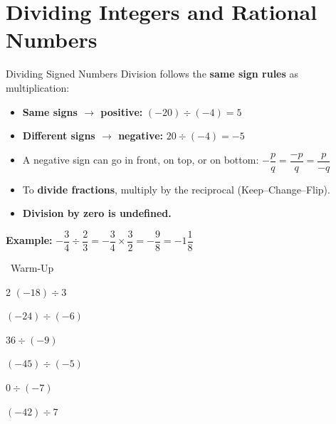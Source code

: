\section{Dividing Integers and Rational Numbers}

\begin{quickReview}{Dividing Signed Numbers}
Division follows the \textbf{same sign rules} as multiplication:

\begin{itemize}[leftmargin=*]
    \item \textbf{Same signs $\to$ positive:} $(-20) \div (-4) = 5$
    \item \textbf{Different signs $\to$ negative:} $20 \div (-4) = -5$
    \item A negative sign can go in front, on top, or on bottom: $-\dfrac{p}{q} = \dfrac{-p}{q} = \dfrac{p}{-q}$
    \item To \textbf{divide fractions}, multiply by the reciprocal (Keep--Change--Flip).
    \item \textbf{Division by zero is undefined.}
\end{itemize}

\medskip
\textbf{Example:} $-\dfrac{3}{4} \div \dfrac{2}{3} = -\dfrac{3}{4} \times \dfrac{3}{2} = -\dfrac{9}{8} = -1\dfrac{1}{8}$
\end{quickReview}

\begin{practiceBox}[funGreen]{\faSun~Warm-Up}


\begin{multicols}{2}
\prob $(-18) \div 3$ \answerBlank[2cm]

\prob $(-24) \div (-6)$ \answerBlank[2cm]

\prob $36 \div (-9)$ \answerBlank[2cm]

\prob $(-45) \div (-5)$ \answerBlank[2cm]

\prob $0 \div (-7)$ \answerBlank[2cm]

\prob $(-42) \div 7$ \answerBlank[2cm]
\end{multicols}
\end{practiceBox}

